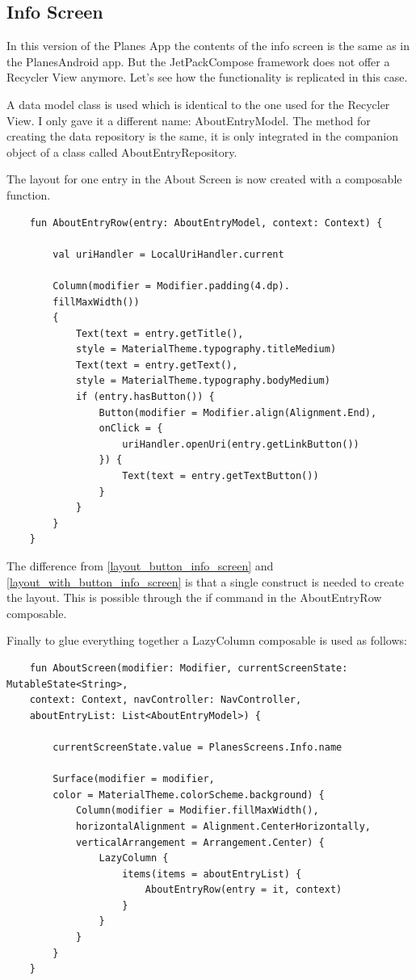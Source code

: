 \subsection{Info Screen}

In this version of the Planes App the contents of the info screen is the same as in the PlanesAndroid app. But the JetPackCompose framework does not offer a Recycler View anymore. Let's see how the functionality is replicated in this case.

A data model class is used which is identical to the one used for the Recycler View. I only gave it a different name: AboutEntryModel. The method for creating the data repository is the same, it is only integrated in the companion object of a class called AboutEntryRepository. 

The layout for one entry in the About Screen is now created with a composable function.

\begin{lstlisting}
	fun AboutEntryRow(entry: AboutEntryModel, context: Context) {
		
		val uriHandler = LocalUriHandler.current
		
		Column(modifier = Modifier.padding(4.dp).
		fillMaxWidth())
		{
			Text(text = entry.getTitle(),
			style = MaterialTheme.typography.titleMedium)
			Text(text = entry.getText(),
			style = MaterialTheme.typography.bodyMedium)
			if (entry.hasButton()) {
				Button(modifier = Modifier.align(Alignment.End),
				onClick = {
					uriHandler.openUri(entry.getLinkButton())
				}) {
					Text(text = entry.getTextButton())
				}
			}
		}
	}
\end{lstlisting}

The difference from \ref{layout_button_info_screen} and \ref{layout_with_button_info_screen} is that a single construct is needed to create the layout. This is possible through the if command in the AboutEntryRow composable.

Finally to glue everything together a LazyColumn composable is used as follows:

\begin{lstlisting}
	fun AboutScreen(modifier: Modifier, currentScreenState: MutableState<String>,
	context: Context, navController: NavController,
	aboutEntryList: List<AboutEntryModel>) {
		
		currentScreenState.value = PlanesScreens.Info.name
		
		Surface(modifier = modifier,
		color = MaterialTheme.colorScheme.background) {
			Column(modifier = Modifier.fillMaxWidth(),
			horizontalAlignment = Alignment.CenterHorizontally,
			verticalArrangement = Arrangement.Center) {
				LazyColumn {
					items(items = aboutEntryList) {
						AboutEntryRow(entry = it, context)
					}
				}
			}
		}
	}
\end{lstlisting}

